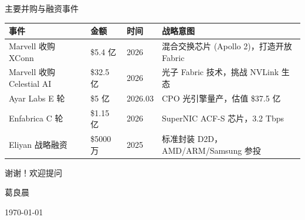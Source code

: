 \documentclass[aspectratio=169, 10pt, UTF8]{ctexbeamer}
\begin{document}
\begin{frame}{主要并购与融资事件}
  \centering
  \footnotesize
  \begin{tabularx}{\textwidth}{p{3.0cm} p{3.0cm} p{2.8cm} p{3.5cm}}
    \toprule
    \textbf{事件} & \textbf{金额} & \textbf{时间} & \textbf{战略意图} \\
    \midrule
    Marvell 收购 XConn
      & \$5.4 亿      & 2026        & 混合交换芯片 (Apollo 2)，打造开放 Fabric \\
    \addlinespace
    Marvell 收购 Celestial AI
      & \$32.5 亿     & 2026        & 光子 Fabric 技术，挑战 NVLink 生态 \\
    \addlinespace
    Ayar Labs E 轮
      & \$5 亿        & 2026.03     & CPO 光引擎量产，估值 \$37.5 亿 \\
    \addlinespace
    Enfabrica C 轮
      & \$1.15 亿     & 2026        & SuperNIC ACF-S 芯片，3.2 Tbps \\
    \addlinespace
    Eliyan 战略融资
      & \$5000 万     & 2025        & 标准封装 D2D，AMD/ARM/Samsung 参投 \\
    \bottomrule
  \end{tabularx}
\end{frame}

\begin{frame}[plain]
  \centering
  \vfill
  {\huge\color{ieeeBlue} 谢谢！欢迎提问}

  \vspace{20pt}
  {\large 葛良晨}

  \vspace{8pt}
  {\large \today}
  \vfill
\end{frame}
\end{document}
